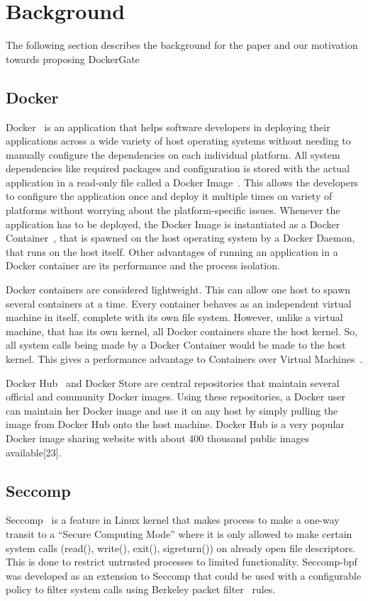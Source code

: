 \section{Background}
\label{sec:background}
The following section describes the background for the paper and our motivation towards proposing DockerGate
\subsection{Docker}
Docker~\cite{docker} is an application that helps software developers in deploying their applications across a wide variety of host operating systems without needing to manually configure the dependencies on each individual platform. All system dependencies like required packages and configuration is stored with the actual application in a read-only file called a Docker Image~\cite{dockerimages}. This allows the developers to configure the application once and deploy it multiple times on variety of platforms without worrying about the platform-specific issues. Whenever the application has to be deployed, the Docker Image is instantiated as a Docker Container~\cite{dockerimages}, that is spawned on the host operating system by a Docker Daemon, that runs on the host itself. Other advantages of running an application in a Docker container are its performance and the process isolation.

Docker containers are considered lightweight. This can allow one host to spawn several containers at a time. Every container behaves as an independent virtual machine in itself, complete with its own file system. However, unlike a virtual machine, that has its own kernel, all Docker containers share the host kernel. So, all system calls being made by a Docker Container would be made to the host kernel. This gives a performance advantage to Containers over Virtual Machines~\cite{kyoung2014}.

Docker Hub~\cite{dockerhub} and Docker Store are central repositories that maintain several official and community Docker images. Using these repositories, a Docker user can maintain her Docker image and use it on any host by simply pulling the image from Docker Hub onto the host machine. Docker Hub is a very popular Docker image sharing website with about 400 thousand public images available[23]. 
\subsection{Seccomp}
Seccomp~\cite{seccomplinux} is a feature in Linux kernel that makes process to make a one-way transit to a “Secure Computing Mode” where it is only allowed to make certain system calls (read(), write(), exit(), sigreturn()) on already open file descriptors. This is done to restrict untrusted processes to limited functionality. Seccomp-bpf~\cite{seccomplinux} was developed as an extension to Seccomp that could be used with a configurable policy to filter system calls using Berkeley packet filter~\cite{bpf1993} rules.

